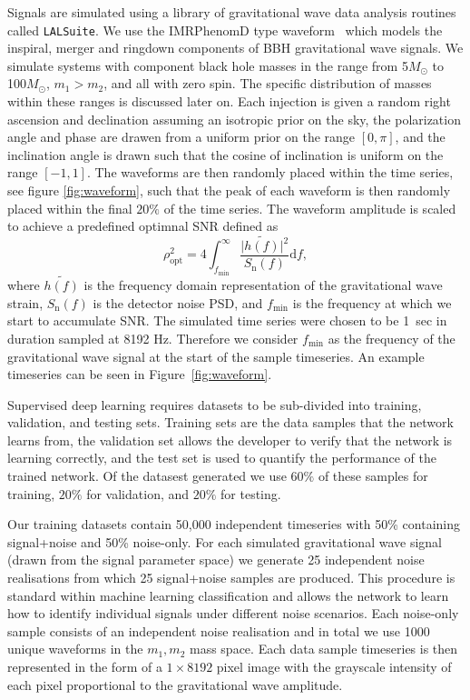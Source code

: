 \documentclass[%
showpacs,
 amsmath,amssymb,
 aps,
 twocolumn,
 prl,
 reprint,
floatfix,
]{revtex4-1}
\begin{document}
%
%
Signals are simulated using a library of gravitational wave data analysis
routines called \texttt{LALSuite}. We use the IMRPhenomD type
waveform~\cite{PhysRevD.93.044006, PhysRevD.93.044007} which models the
inspiral, merger and ringdown components of \ac{BBH} gravitational wave
signals. We simulate systems with component black hole masses in the range from
5\(M_\odot\) to 100\(M_\odot\), $m_{1} > m_{2}$, and all with zero spin. The
specific distribution of masses within these ranges is discussed later on. Each
injection is given a random right ascension and declination assuming an
isotropic prior on the sky, the polarization angle and phase are drawen from a
uniform prior on the range $[0,\pi]$, and the inclination angle is drawn such
that the cosine of inclination is uniform on the range $[-1,1]$. The waveforms
are then randomly placed within the time series, see figure \ref{fig:waveform},
such that the peak of each waveform is then randomly placed within the final $ 20\% $ of the time series. The waveform amplitude is scaled to achieve a predefined optimnal
\ac{SNR} defined as
%
%
\begin{equation} \label{eq:snr} \rho_{\mathrm{opt}}^{2} = 4
\int_{f_{\mathrm{min}}}^{\infty} \frac{\lvert
\tilde{h(f)}\rvert^{2}}{S_{\mathrm{n}}(f)} \mathrm{d}f, \end{equation}
%
where $\tilde{h(f)}$ is the frequency domain representation of the
gravitational wave strain, $S_{\mathrm{n}}(f)$ is the detector noise \ac{PSD},
and $f_{\mathrm{min}}$ is the frequency at which we start to accumulate
\ac{SNR}. The simulated time series were chosen to be 1~sec in duration sampled
at 8192 Hz. Therefore we consider $f_{\mathrm{min}}$ as the
frequency of the gravitational wave signal at the start of the sample
timeseries. An example timeseries can be seen in Figure~\ref{fig:waveform}. 

%
%
Supervised deep learning requires
datasets to be sub-divided into training, validation, and testing sets. Training sets are the data samples that the network learns from, the validation
set allows the developer to verify that the network is learning correctly, and
the test set is used to quantify the performance of the trained network.
Of the datasest generated we use $60\%$ of these samples for training,
$20\%$ for validation, and $20\%$ for testing.

%
%
Our training datasets contain 50,000 independent timeseries with 50\% containing
signal+noise and 50\% noise-only. For each simulated gravitational wave signal
(drawn from the signal parameter space) we generate 25 independent noise
realisations from which 25 signal+noise samples are produced. This procedure is
standard within machine learning classification and allows the network to learn
how to identify individual signals under different noise scenarios. Each
noise-only sample consists of an independent noise realisation and in total we
use 1000 unique waveforms in the $m_{1},m_{2}$ mass space. Each data sample
timeseries is then represented in the form of a $1 \times 8192$ pixel image
with the grayscale intensity of each pixel proportional to the gravitational
wave amplitude.
\end{document}
